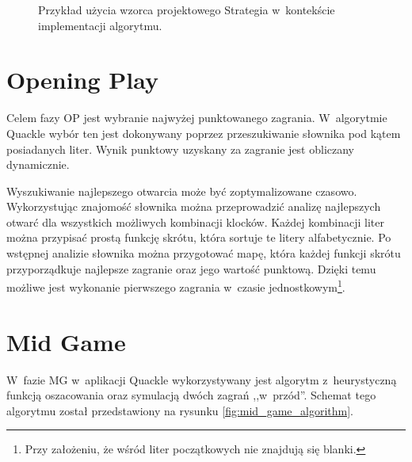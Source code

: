 \documentclass[a4paper,twocolumn,11pt]{article}
\theoremstyle{definition}
\begin{document}
\begin{figure}[ht!]
	\centering
	\caption{Przykład użycia wzorca projektowego Strategia w~kontekście implementacji algorytmu.}
	\label{fig:strategy_pattern}
\end{figure}

\section{Opening Play}

Celem fazy OP jest wybranie najwyżej punktowanego zagrania. W~algorytmie Quackle wybór ten jest dokonywany poprzez przeszukiwanie słownika pod kątem posiadanych liter. Wynik punktowy uzyskany za zagranie jest obliczany dynamicznie. 

Wyszukiwanie najlepszego otwarcia może być zoptymalizowane czasowo. Wykorzystując znajomość słownika można przeprowadzić analizę najlepszych otwarć dla wszystkich możliwych kombinacji klocków. Każdej kombinacji liter można przypisać prostą funkcję skrótu, która sortuje te litery alfabetycznie. Po wstępnej analizie słownika można przygotować mapę, która każdej funkcji skrótu przyporządkuje najlepsze zagranie oraz jego wartość punktową. Dzięki temu możliwe jest wykonanie pierwszego zagrania w~czasie jednostkowym\footnote{Przy założeniu, że wśród liter początkowych nie znajdują się blanki.}.

\section{Mid Game}

W~fazie MG w~aplikacji Quackle wykorzystywany jest algorytm z~heurystyczną funkcją oszacowania oraz symulacją dwóch zagrań ,,w~przód''. Schemat tego algorytmu został przedstawiony na rysunku \ref{fig:mid_game_algorithm}.~\cite{quackle_algorithm}
\end{document}
